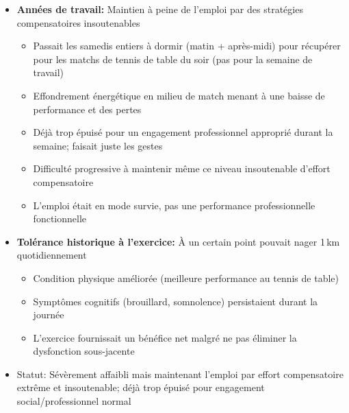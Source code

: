 \begin{description}
\begin{itemize}
\begin{itemize}
            \item Dormait fréquemment durant les cours tout au long de la journée (pas seulement après le déjeuner)
            \item Le sommeil était une réponse involontaire à l'épuisement accablant, pas simple somnolence
            \item Les difficultés académiques reflétaient le déficit énergétique empêchant l'attention soutenue, pas un manque de capacité intellectuelle
        \end{itemize}
        \item \textbf{Années de travail:} Maintien à peine de l'emploi par des stratégies compensatoires insoutenables
        \begin{itemize}
            \item Passait les samedis entiers à dormir (matin + après-midi) pour récupérer pour les matchs de tennis de table du soir (pas pour la semaine de travail)
            \item Effondrement énergétique en milieu de match menant à une baisse de performance et des pertes
            \item Déjà trop épuisé pour un engagement professionnel approprié durant la semaine; faisait juste les gestes
            \item Difficulté progressive à maintenir même ce niveau insoutenable d'effort compensatoire
            \item L'emploi était en mode survie, pas une performance professionnelle fonctionnelle
        \end{itemize}
        \item \textbf{Tolérance historique à l'exercice:} À un certain point pouvait nager 1\,km quotidiennement
        \begin{itemize}
            \item Condition physique améliorée (meilleure performance au tennis de table)
            \item Symptômes cognitifs (brouillard, somnolence) persistaient durant la journée
            \item L'exercice fournissait un bénéfice net malgré ne pas éliminer la dysfonction sous-jacente
        \end{itemize}
        \item Statut: Sévèrement affaibli mais maintenant l'emploi par effort compensatoire extrême et insoutenable; déjà trop épuisé pour engagement social/professionnel normal
    \end{itemize}


\end{description}
